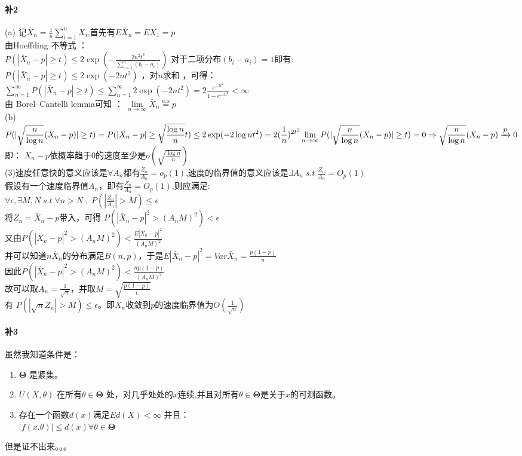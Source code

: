 \documentclass[12pt,a4paper]{ctexart}
\begin{document}
\paragraph{补2}
(a) 记$\bar{X}_n = \frac{1}{n}\sum_{i = 1}^{n}X_i$,首先有$E\bar{X}_n = EX_1 = p$\\
由Hoeffding 不等式 ：\\
$P(|\bar{X}_n - p| \geq t) \leq 2\exp(-\frac{2n^2t^2}{\sum_{i=1}^{n}(b_i - a_i)}) $ 对于二项分布$(b_i - a_i) = 1$即有:\\
$P(|\bar{X}_n - p| \geq t) \leq 2\exp(-2nt^2)$ ，对$n$求和 ，可得：\\
$\displaystyle \sum_{n =1}^{\infty}P(|\bar{X}_n - p| \geq t) \leq \sum_{n = 1}^{\infty}2\exp(-2nt^2) = 2\frac{e^{-2t^2}}{1 - e^{-2t^2}} < \infty$\\
由 Borel–Cantelli lemma可知 ：
$\lim\limits_{n \to \infty}\bar{X}_n \overset{a.s}{=} p$\\
(b)$\displaystyle P(|\sqrt{\frac{n}{\log n}}(\bar{X}_n - p)| \geq t) = P(|\bar{X}_n - p| \geq \sqrt{\frac{\log n}{n}}t)\\
 \leq 2\exp(-2\log nt^2) = 2(\frac{1}{n})^{2t^2} \\
 \lim\limits_{n \to \infty}P(|\sqrt{\frac{n}{\log n}}(\bar{X}_n - p)| \geq t) = 0 \Rightarrow \sqrt{\frac{n}{\log n}}(\bar{X}_n - p) \xrightarrow{\mathcal{P}} 0 $\\
 即：
  $X_n - p$依概率趋于0的速度至少是$o(\sqrt{\frac{\log n}{n}})$\\
 (3)速度任意快的意义应该是$\displaystyle \forall A_n \text{都有} \frac{Z_n}{A_n} = o_p(1)$,速度的临界值的意义应该是$\displaystyle \exists A_n \; s.t \; \frac{Z_n}{A_n} = O_p(1)$\\
 假设有一个速度临界值$A_n$，即有$\displaystyle \frac{Z_n}{A_n} = O_p(1)$,则应满足:\\
 $\displaystyle \forall \epsilon,\exists M,N \; s.t \; \forall n>N \;,\;P(|\frac{Z_n}{A_n}| > M) \leq \epsilon$\\
 将$Z_n = \bar{X}_n - p$带入，可得 $P(|\bar{X}_n - p|^2 > (A_nM)^2) < \epsilon$\\
 又由$\displaystyle P(|\bar{X}_n - p|^2 > (A_nM)^2) < \frac{E|\bar{X}_n - p|^2}{(A_nM)^2}$\\
 并可以知道$n\bar{X}_n$的分布满足$B(n,p)$，于是$\displaystyle E|\bar{X}_n - p|^2 = Var\bar{X}_n = \frac{p(1-p)}{n}$\\
 因此$\displaystyle P(|\bar{X}_n - p|^2 > (A_nM)^2) < \frac{np(1-p)}{(A_nM)^2}$\\
 故可以取$\displaystyle A_n = \frac{1}{\sqrt{n}}$，并取$M = \sqrt{\frac{p(1-p)}{\epsilon}}$\\
 有 $\displaystyle P(|\sqrt{n}Z_n| > M) \leq \epsilon$。即$\bar{X}_n$收敛到$p$的速度临界值为$O(\frac{1}{\sqrt{n}})$
 \paragraph{补3}
 虽然我知道条件是：
\begin{enumerate}
\item $\bm\Theta$ 是紧集。
\item $U(X, \theta )$ 在所有$\theta \in \bm\Theta$ 处，对几乎处处的$x$连续,并且对所有$\theta \in \bm\Theta$是关于$x$的可测函数。
\item 存在一个函数$d(x)$满足$Ed(X) < \infty$ 并且：\\
$|f(x.\theta)| \leq d(x) \forall \theta \in \bm\Theta$
\end{enumerate}
但是证不出来。。。
\end{document}
